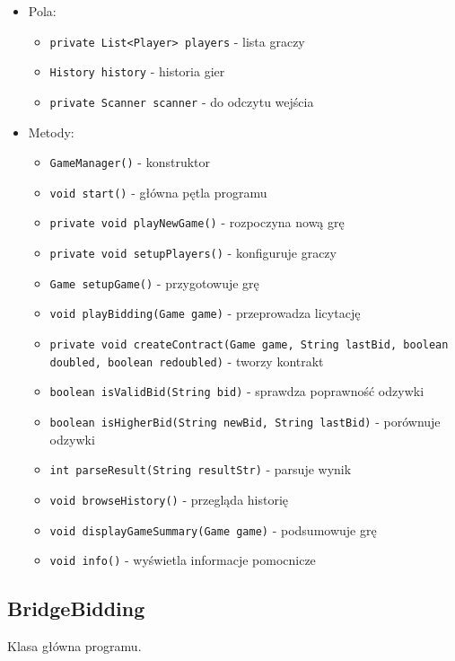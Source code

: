 \documentclass{article}
\begin{document}
\begin{itemize}
    \item Pola:
    \begin{itemize}
        \item \texttt{private List<Player> players} - lista graczy
        \item \texttt{History history} - historia gier
        \item \texttt{private Scanner scanner} - do odczytu wejścia
    \end{itemize}
    
    \item Metody:
    \begin{itemize}
        \item \texttt{GameManager()} - konstruktor
        \item \texttt{void start()} - główna pętla programu
        \item \texttt{private void playNewGame()} - rozpoczyna nową grę
        \item \texttt{private void setupPlayers()} - konfiguruje graczy
        \item \texttt{Game setupGame()} - przygotowuje grę
        \item \texttt{void playBidding(Game game)} - przeprowadza licytację
        \item \texttt{private void createContract(Game game, String lastBid, boolean doubled, boolean redoubled)} - tworzy kontrakt
        \item \texttt{boolean isValidBid(String bid)} - sprawdza poprawność odzywki
        \item \texttt{boolean isHigherBid(String newBid, String lastBid)} - porównuje odzywki
        \item \texttt{int parseResult(String resultStr)} - parsuje wynik
        \item \texttt{void browseHistory()} - przegląda historię
        \item \texttt{void displayGameSummary(Game game)} - podsumowuje grę
        \item \texttt{void info()} - wyświetla informacje pomocnicze
    \end{itemize}
\end{itemize}

\subsection{BridgeBidding}
Klasa główna programu.
\end{document}

